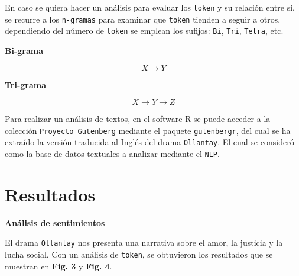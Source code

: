 \documentclass[article,30pt,extrafontsizes]{memoir}
\begin{document}
\begin{multicols*}{3}
{En caso se quiera hacer un análisis para evaluar los \texttt{\colorbox{tio}{\textcolor{titleboxbgcol}{token}}} y su relación entre si, se recurre a los \texttt{\colorbox{tio}{\textcolor{titleboxbgcol}{n-gramas}}} para examinar que \texttt{\colorbox{tio}{\textcolor{titleboxbgcol}{token}}} tienden a seguir a otros, dependiendo del número de \texttt{\colorbox{tio}{\textcolor{titleboxbgcol}{token}}} se emplean los sufijos:  \texttt{\colorbox{tio}{\textcolor{titleboxbgcol}{Bi}}}, \texttt{\colorbox{tio}{\textcolor{titleboxbgcol}{Tri}}}, \texttt{\colorbox{tio}{\textcolor{titleboxbgcol}{Tetra}}}, etc.

\vspace{0.5em}

\textbf{Bi-grama}

$$X\longrightarrow Y$$

\vspace{0.5em}

\textbf{Tri-grama}

$$X\longrightarrow Y\longrightarrow Z$$

Para realizar un análisis de textos, en el software R se puede acceder a la colección \texttt{\colorbox{tio}{\textcolor{titleboxbgcol}{Proyecto Gutenberg}}} mediante el paquete \texttt{\colorbox{tio}{\textcolor{titleboxbgcol}{gutenbergr}}}, del cual se ha extraído la versión traducida al Inglés del drama \texttt{\colorbox{tio}{\textcolor{titleboxbgcol}{Ollantay}}}. El cual se consideró como la base de datos textuales a analizar mediante el \texttt{\colorbox{tio}{\textcolor{titleboxbgcol}{NLP}}}.

\section{Resultados}\label{resultados}

\textbf{Análisis de sentimientos}

El drama \texttt{\colorbox{tio}{\textcolor{titleboxbgcol}{Ollantay}}} nos presenta una narrativa sobre el amor, la justicia y la lucha social. Con un análisis de \texttt{\colorbox{tio}{\textcolor{titleboxbgcol}{token}}}, se obtuvieron los resultados que se muestran en \textbf{Fig. 3} y \textbf{Fig. 4}.

}
\end{multicols*}
\end{document}
